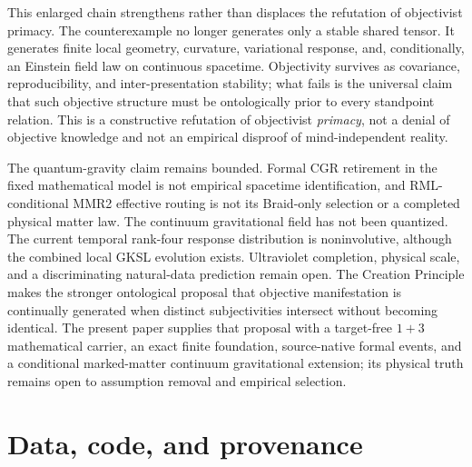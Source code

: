 \documentclass[11pt]{article}
\theoremstyle{definition}
\theoremstyle{remark}
\begin{document}
This enlarged chain strengthens rather than displaces the refutation of objectivist primacy. The counterexample no longer generates only a stable shared tensor. It generates finite local geometry, curvature, variational response, and, conditionally, an Einstein field law on continuous spacetime. Objectivity survives as covariance, reproducibility, and inter-presentation stability; what fails is the universal claim that such objective structure must be ontologically prior to every standpoint relation. This is a constructive refutation of objectivist \emph{primacy}, not a denial of objective knowledge and not an empirical disproof of mind-independent reality.

The quantum-gravity claim remains bounded. Formal CGR retirement in the fixed mathematical model is not empirical spacetime identification, and RML-conditional MMR2 effective routing is not its Braid-only selection or a completed physical matter law. The continuum gravitational field has not been quantized. The current temporal rank-four response distribution is noninvolutive, although the combined local GKSL evolution exists. Ultraviolet completion, physical scale, and a discriminating natural-data prediction remain open. The Creation Principle makes the stronger ontological proposal that objective manifestation is continually generated when distinct subjectivities intersect without becoming identical. The present paper supplies that proposal with a target-free $1+3$ mathematical carrier, an exact finite foundation, source-native formal events, and a conditional marked-matter continuum gravitational extension; its physical truth remains open to assumption removal and empirical selection.

\section*{Data, code, and provenance}
\end{document}
